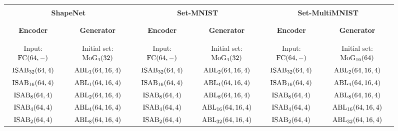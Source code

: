 \documentclass[final]{arxiv/cvpr}
\begin{document}
\begin{figure*}[!t]
\begin{minipage}{\linewidth}
\vspace{-0.2cm}
\centering
    \begin{adjustbox}{width=0.95\textwidth}
        \label{table:architecture}
        \begin{tabular}{cc|cc|cc}
        \Xhline{2\arrayrulewidth}
        \\[-1em] \multicolumn{2}{c}{\textbf{ShapeNet}} & \multicolumn{2}{c}{\textbf{Set-MNIST}} & \multicolumn{2}{c}{\textbf{Set-MultiMNIST}}\\
        \\[-1em]\Xhline{2\arrayrulewidth}
        \\[-1em] \textbf{Encoder} & \textbf{Generator} & \textbf{Encoder} & \textbf{Generator} & \textbf{Encoder} & \textbf{Generator} \\
        \\[-1em]\Xhline{2\arrayrulewidth}
        \\[-1em]
        Input: $\textnormal{FC}(64, -)$ & Initial set: $\textnormal{MoG}_4(32)$ & Input: $\textnormal{FC}(64, -)$ & Initial set: $\textnormal{MoG}_4(32)$ & Input: $\textnormal{FC}(64, -)$ & Initial set: $\textnormal{MoG}_{16}(64)$ \\
        $\textnormal{ISAB}_{32}(64, 4)$ & $\textnormal{ABL}_{1}(64, 16, 4)$ & $\textnormal{ISAB}_{32}(64, 4)$ & $\textnormal{ABL}_{2}(64, 16, 4)$ & $\textnormal{ISAB}_{32}(64, 4)$ & $\textnormal{ABL}_{2}(64, 16, 4)$ \\
        $\textnormal{ISAB}_{16}(64, 4)$ & $\textnormal{ABL}_{1}(64, 16, 4)$ & $\textnormal{ISAB}_{16}(64, 4)$ & $\textnormal{ABL}_{4}(64, 16, 4)$ & $\textnormal{ISAB}_{16}(64, 4)$ & $\textnormal{ABL}_{4}(64, 16, 4)$ \\
        $\textnormal{ISAB}_{8}(64, 4)$ & $\textnormal{ABL}_{2}(64, 16, 4)$ & $\textnormal{ISAB}_{8}(64, 4)$ & $\textnormal{ABL}_{8}(64, 16, 4)$ & $\textnormal{ISAB}_{8}(64, 4)$ & $\textnormal{ABL}_{8}(64, 16, 4)$ \\
        $\textnormal{ISAB}_{4}(64, 4)$ & $\textnormal{ABL}_{4}(64, 16, 4)$ & $\textnormal{ISAB}_{4}(64, 4)$ & $\textnormal{ABL}_{16}(64, 16, 4)$ & $\textnormal{ISAB}_{4}(64, 4)$ & $\textnormal{ABL}_{16}(64, 16, 4)$ \\
        $\textnormal{ISAB}_{2}(64, 4)$ & $\textnormal{ABL}_{8}(64, 16, 4)$ & $\textnormal{ISAB}_{2}(64, 4)$ & $\textnormal{ABL}_{32}(64, 16, 4)$ & $\textnormal{ISAB}_{2}(64, 4)$ & $\textnormal{ABL}_{32}(64, 16, 4)$ \\

\end{tabular}
\end{adjustbox}
\end{minipage}
\end{figure*}
\end{document}
